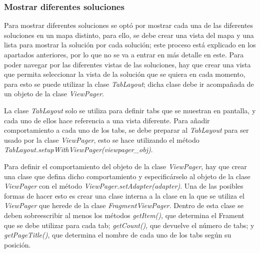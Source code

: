 \subsubsection{Mostrar diferentes soluciones}
Para mostrar diferentes soluciones se optó por mostrar cada una de las diferentes soluciones en un mapa distinto, para ello, se debe crear una vista del mapa y una lista para mostrar la solución por cada solución; este proceso está explicado en los apartados anteriores, por lo que no se va a entrar en más detalle en este. Para poder navegar por las diferentes vistas de las soluciones, hay que crear una vista que permita seleccionar la vista de la solución que se quiera en cada momento, para esto se puede utilizar la clase \textit{TabLayout}; dicha clase debe ir acompañada de un objeto de la clase \textit{ViewPager}.\newline

La clase \textit{TabLayout} solo se utiliza para definir tabs  que se muestran en pantalla, y cada uno de ellos hace referencia a una vista diferente. Para añadir comportamiento a cada uno de los tabs, se debe preparar al \textit{TabLayout} para ser usado por la clase \textit{ViewPager}, esto se hace utilizando el método \textit{TabLayout.setupWithViewPager(viewpager\_obj)}.\newline

Para definir el comportamiento del objeto de la clase \textit{ViewPager}, hay que crear una clase que defina dicho comportamiento y especificárselo al objeto de la clase \textit{ViewPager} con el método \textit{ViewPager.setAdapter(adapter)}. Una de las posibles formas de hacer esto es crear una clase interna a la clase en la que se utiliza el \textit{ViewPager} que herede de la clase \textit{FragmentViewPager}. Dentro de esta clase se deben sobreescribir al menos los métodos \textit{getItem()}, que determina el Frament que se debe utilizar para cada tab; \textit{getCount()}, que devuelve el número de tabs; y \textit{getPageTitle()}, que determina el nombre de cada uno de los tabs según su posición. \newline

